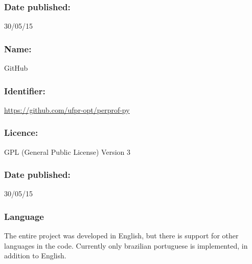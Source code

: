     \subsubsection*{Date published:} 30/05/15

\CodeRepository

    \subsubsection*{Name:} GitHub

    \subsubsection*{Identifier:} \url{https://github.com/ufpr-opt/perprof-py}

    \subsubsection*{Licence:} GPL (General Public License) Version 3

    \subsubsection*{Date published:} 30/05/15

\subsubsection*{Language}

    The entire project was developed in English, but there is support for
    other languages in the code. Currently only brazilian portuguese is
    implemented, in addition to English.

